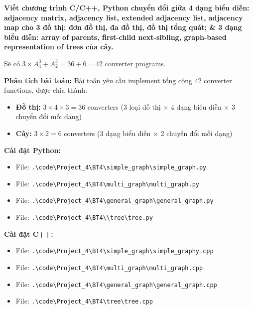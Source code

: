 \documentclass[12pt,a4paper]{article}
\begin{document}
\begin{problembox}
    \textbf{Viết chương trình C/C++, Python chuyển đổi giữa 4 dạng biểu diễn: adjacency matrix, adjacency list, extended adjacency list, adjacency map cho 3 đồ thị: đơn đồ thị, đa đồ thị, đồ thị tổng quát; \& 3 dạng biểu diễn: array of parents, first-child next-sibling, graph-based representation of trees của cây.} 
    
    Sẽ có $3 \times A_4^3 + A_2^3 = 36 + 6 = 42$ converter programs.

\end{problembox}

\textbf{Phân tích bài toán:} Bài toán yêu cầu implement tổng cộng 42 converter functions, được chia thành:

\begin{itemize}
    \item \textbf{Đồ thị:} $3 \times 4 \times 3 = 36$ converters (3 loại đồ thị × 4 dạng biểu diễn × 3 chuyển đổi mỗi dạng)
    \item \textbf{Cây:} $3 \times 2 = 6$ converters (3 dạng biểu diễn × 2 chuyển đổi mỗi dạng)
\end{itemize}

\textbf{Cài đặt Python:}
\begin{itemize}[label=\textbullet]
   \item File: \texttt{.\textbackslash code\textbackslash Project\_4\textbackslash BT4\textbackslash simple\_graph\textbackslash simple\_graph.py}
   \item  File: \texttt{.\textbackslash code\textbackslash Project\_4\textbackslash BT4\textbackslash multi\_graph\textbackslash multi\_graph.py}
   \item  File: \texttt{.\textbackslash code\textbackslash Project\_4\textbackslash BT4\textbackslash general\_graph\textbackslash general\_graph.py}
   \item  File: \texttt{.\textbackslash code\textbackslash Project\_4\textbackslash BT4\textbackslash \textbackslash tree\textbackslash tree.py}
\end{itemize}

\textbf{Cài đặt C++:}
\begin{itemize}[label=\textbullet]
   \item File: \texttt{.\textbackslash code\textbackslash Project\_4\textbackslash BT4\textbackslash simple\_graph\textbackslash simple\_graphy.cpp }
   \item File: \texttt{.\textbackslash code\textbackslash Project\_4\textbackslash BT4\textbackslash multi\_graph\textbackslash multi\_graph.cpp }
   \item File: \texttt{.\textbackslash code\textbackslash Project\_4\textbackslash BT4\textbackslash general\_graph\textbackslash general\_graph.cpp }
   \item File: \texttt{.\textbackslash code\textbackslash Project\_4\textbackslash BT4\textbackslash tree\textbackslash tree.cpp }
\end{itemize}
\newpage
\end{document}
